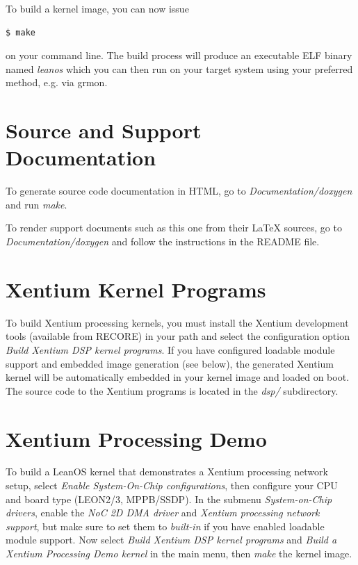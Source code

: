 \noindent
To build a kernel image, you can now issue

\begin{lstlisting}[language=bash]
  $ make
\end{lstlisting}

\noindent
on your command line. The build process will produce an executable ELF binary
named \emph{leanos} which you can then run on your target system using your
preferred method, e.g. via grmon.



\section {Source and Support Documentation}

To generate source code documentation in HTML, go to \emph{Documentation/doxygen}
and run \emph{make}.

To render support documents such as this one from their LaTeX sources, go
to \emph{Documentation/doxygen} and follow the instructions in the README file.




\section {Xentium Kernel Programs}

To build \gls{Xentium} processing kernels, you must install the Xentium
development tools (available from RECORE) in your path and select the
configuration option \emph{Build Xentium DSP kernel programs}.  If you have
configured loadable module support and embedded image generation (see below),
the generated Xentium kernel will be automatically embedded in your kernel
image and loaded on boot. \\

\noindent
The source code to the Xentium programs is located in the \emph{dsp/}
subdirectory.


\section {Xentium Processing Demo}

To build a LeanOS kernel that demonstrates a Xentium processing network setup,
select \emph{Enable System-On-Chip configurations}, then configure your CPU and
board type (LEON2/3, MPPB/SSDP). In the submenu \emph{System-on-Chip
drivers}, enable the \emph{NoC 2D DMA driver} and \emph{Xentium processing
network support}, but make sure to set them to \emph{built-in} if you have
enabled loadable module support. Now select \emph{Build Xentium DSP kernel
programs} and \emph{Build a Xentium Processing Demo kernel} in the main menu,
then \emph{make} the kernel image.

